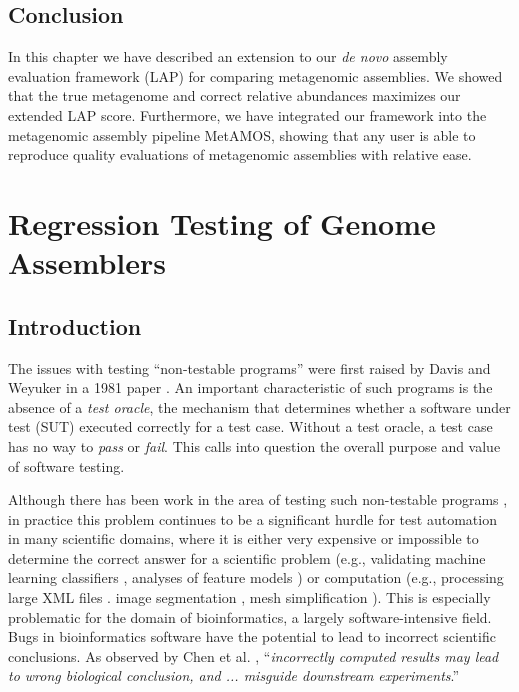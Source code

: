 \documentclass[12pt,\mydriver]{thesis}
\begin{document}
\section{Conclusion}
In this chapter we have described an extension to our \emph{de novo} assembly evaluation framework (LAP) for comparing metagenomic assemblies.
We showed that the true metagenome and correct relative abundances maximizes our extended LAP score.
Furthermore, we have integrated our framework into the metagenomic assembly pipeline MetAMOS, showing that any user is able to reproduce quality evaluations of metagenomic assemblies with relative ease.
\clearpage{}
\clearpage{}\renewcommand{\thechapter}{4}
\chapter{Regression Testing of Genome Assemblers}
\section{Introduction}

The issues with testing ``non-testable programs'' were first raised by Davis
and Weyuker in a 1981 paper \cite{Davis:1981:PNP:800175.809889}. An important
characteristic of such programs is the absence of a {\it test oracle}, the
mechanism that determines whether a software under test (SUT) executed
correctly for a test case.  Without a test oracle, a test case has no way to
{\it pass} or {\it fail}. This calls into question the overall purpose and
value of software testing.

Although there has been work in the area of testing such non-testable programs
\cite{McMinn:2009:SFD:1569901.1570127,Murphy:2010:MTT:1970820,Murphy:2009:AST:1572272.1572295,Yoo:2010:MTS:1799526.1799581,Chan:2010:FFP:1815297.1815298,Chen:2002:SIM:566172.566202,Lazic:2005:AMS:1983314.1983364,Just:2010:AST:1808266.1808280,Just:2011:AUI:2036458.2036488},
in practice this problem continues to be a significant hurdle for test
automation in many scientific domains, where it is either very expensive or
impossible to determine the correct answer for a scientific problem
\cite{Hook:2009:TTS:1556904.1556936} (e.g., validating machine learning
classifiers \cite{Xie:2011:TVM:1942318.1942371}, analyses of feature models
\cite{Segura:2011:AMT:1937186.1937327}) or computation (e.g., processing large
XML files \cite{Kim-Park:2010:ATO:1868048.1868050}.  image segmentation
\cite{Frounchi:2011:AIS:2038078.2038454}, mesh simplification
\cite{chan2009pat}).  This is especially problematic for the
domain of bioinformatics, a largely software-intensive field. Bugs in
bioinformatics software have the potential to lead to incorrect scientific
conclusions.  As observed by Chen et al.  \cite{BMC}, ``{\it incorrectly
computed results may lead to wrong biological conclusion, and ...
misguide downstream experiments}.''
\end{document}
